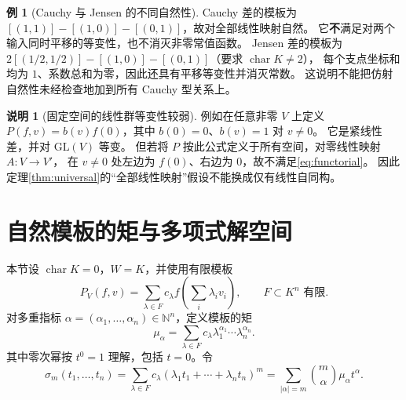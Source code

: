 \documentclass[UTF8,11pt,a4paper]{ctexart}
\theoremstyle{definition}
\newtheorem{example}[theorem]{例}
\newtheorem{remark}[theorem]{说明}
\newcommand{\N}{\mathbb N}
\numberwithin{equation}{section}
\begin{document}
\begin{example}[Cauchy 与 Jensen 的不同自然性]
Cauchy 差的模板为
$[(1,1)]-[(1,0)]-[(0,1)]$，故对全部线性映射自然。
它\textbf{不}满足对两个输入同时平移的等变性，也不消灭非零常值函数。
Jensen 差的模板为
$2[(1/2,1/2)]-[(1,0)]-[(0,1)]$（要求 $\operatorname{char}K\ne2$），
每个支点坐标和均为 $1$、系数总和为零，因此还具有平移等变性并消灭常数。
这说明不能把仿射自然性未经检查地加到所有 Cauchy 型关系上。
\end{example}

\begin{remark}[固定空间的线性群等变性较弱]
例如在任意非零 $V$ 上定义
$P(f,v)=b(v)f(0)$，其中 $b(0)=0$、$b(v)=1$ 对 $v\ne0$。
它是紧线性差，并对 $\mathrm{GL}(V)$ 等变。
但若将 $P$ 按此公式定义于所有空间，对零线性映射 $A:V\to V'$，
在 $v\ne0$ 处左边为 $f(0)$、右边为 $0$，故不满足\eqref{eq:functorial}。
因此定理\ref{thm:universal}的“全部线性映射”假设不能换成仅有线性自同构。
\end{remark}

\section{自然模板的矩与多项式解空间}\label{sec:moments}
本节设 $\operatorname{char}K=0$，$W=K$，并使用有限模板
\[
 P_V(f,v)=\sum_{\lambda\in F}c_\lambda f\left(\sum_i\lambda_iv_i\right),
 \qquad F\subset K^n\text{ 有限}.
\]
对多重指标 $\alpha=(\alpha_1,\ldots,\alpha_n)\in\N^n$，定义模板的矩
\[
 \mu_\alpha=\sum_{\lambda\in F}c_\lambda\lambda_1^{\alpha_1}\cdots\lambda_n^{\alpha_n}.
\]
其中零次幂按 $t^0=1$ 理解，包括 $t=0$。令
\begin{equation}\label{eq:symbol}
 \sigma_m(t_1,\ldots,t_n)=\sum_{\lambda\in F}c_\lambda
 (\lambda_1t_1+\cdots+\lambda_nt_n)^m
 =\sum_{|\alpha|=m}\binom m\alpha\mu_\alpha t^\alpha.
\end{equation}
\end{document}
